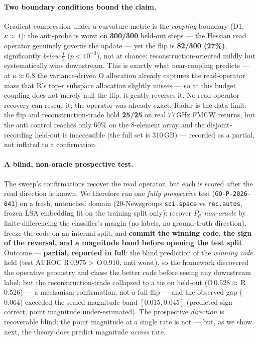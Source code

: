 \documentclass[10pt]{article} %
\theoremstyle{remark}
\newcommand{\PC}{P_{\mathcal{C}}}
\newcommand{\kalign}{\kappa}
\newcommand{\seal}[1]{\texttt{GO-P-2026-#1}}
\begin{document}
\paragraph{Two boundary conditions bound the claim.} Gradient compression under a
curvature metric is the \emph{coupling} boundary (D1, $\kalign\approx1$): the anti-probe
is worst on \textbf{300/300} held-out steps --- the Hessian read operator genuinely
governs the update --- yet the flip is \textbf{82/300 (27\%)}, significantly \emph{below}
$\tfrac12$ ($p<10^{-3}$), not at chance: reconstruction-oriented mildly but systematically
wins downstream. This is exactly what near-coupling predicts --- at $\kalign\approx0.8$ the
variance-driven O allocation already captures the read-operator mass that R's top-$r$
subspace allocation slightly misses --- so at this budget coupling does not merely null the
flip, it gently reverses it. No read-operator recovery can rescue it; the operator was
already exact. Radar is the data limit: the flip and reconstruction-trade hold
\textbf{25/25} on real 77\,GHz FMCW returns, but the anti control reaches only 60\% on the
8-element array and the disjoint-recording held-out is inaccessible (the full set is
310\,GB) --- recorded as a partial, not inflated to a confirmation.

\paragraph{A blind, non-oracle prospective test.} The sweep's confirmations recover the read
operator, but each is scored after the read direction is known. We therefore ran one
\emph{fully prospective} test (\seal{041}) on a fresh, untouched domain (20-Newsgroups
\texttt{sci.space} vs \texttt{rec.autos}, frozen LSA embedding fit on the training split
only): recover $\PC$ \emph{non-oracle} by finite-differencing the classifier's margin (no
labels, no ground-truth direction), freeze the code on an internal split, and \textbf{commit
the winning code, the sign of the reversal, and a magnitude band before opening the test
split}. Outcome --- \textbf{partial, reported in full}: the blind prediction of the
\emph{winning code} held (test AUROC R\,$0.975>$\,O\,$0.910$, anti worst), so the framework
discovered the operative geometry and chose the better code before seeing any downstream
label; but the reconstruction-trade collapsed to a tie on held-out (O\,$0.528\approx$\,R\,$0.526$)
--- a mechanism confirmation, not a full flip --- and the observed gap ($0.064$) exceeded the
sealed magnitude band $[0.015,0.045]$ (predicted sign correct, point magnitude
under-estimated). The prospective \emph{direction} is recoverable blind; the point magnitude
at a single rate is not --- but, as we show next, the theory does predict magnitude
\emph{across} rate.
\end{document}
